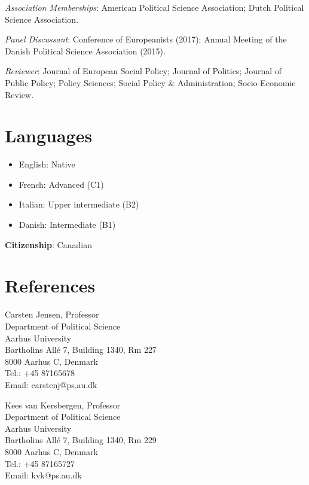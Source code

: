 \documentclass[letterpaper,fontsize=10pt]{scrartcl}
\begin{document}
	 \textit{Association Memberships}: American Political Science Association; Dutch Political Science Association.\\ [-1ex]

	 \textit{Panel Discussant}:	Conference of Europeanists (2017); Annual Meeting of the Danish Political Science Association (2015).\\ [-1ex]

	 \textit{Reviewer}: Journal of European Social Policy; Journal of Politics; Journal of Public Policy; Policy Sciences; Social Policy \& Administration; Socio-Economic Review.

	\section{Languages}
	\vspace{-.25em}
	\begin{itemize}[noitemsep]
		\item English: Native
		\item French: Advanced (C1)
		\item Italian: Upper intermediate (B2)
		\item Danish: Intermediate (B1)\\ [-1.5ex]
	\end{itemize}

	 \textbf{Citizenship}: Canadian

\section{References}
		\vspace{-.5em}

	\begin{minipage}[t]{0.54\textwidth}
		Carsten Jensen, Professor\\
		Department of Political Science\\
		Aarhus University\\
		Bartholins Allé 7, Building 1340, Rm 227\\
		8000 Aarhus C, Denmark\\
		Tel.: +45 87165678\\
		Email: carstenj@ps.au.dk\\
	\end{minipage}
	\begin{minipage}[t]{0.46\textwidth}
		Kees van Kersbergen, Professor\\
		Department of Political Science\\
		Aarhus University\\
		Bartholins Allé 7, Building 1340, Rm 229\\
		8000 Aarhus C, Denmark\\
		Tel.: +45 87165727\\
		Email: kvk@ps.au.dk\\
	\end{minipage}
	\smallskip
\end{document}
